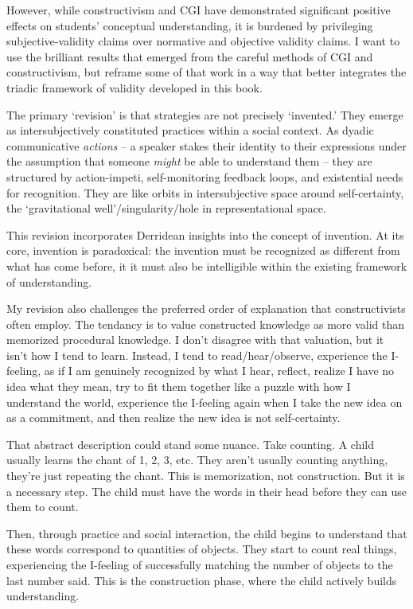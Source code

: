 \documentclass[12pt]{book}
\begin{document}
However, while constructivism and CGI have demonstrated significant positive effects on students' conceptual understanding, it is burdened by privileging subjective-validity claims over normative and objective validity claims. I want to use the brilliant results that emerged from the careful methods of CGI and constructivism, but reframe some of that work in a way that better integrates the triadic framework of validity developed in this book.

The primary `revision' is that strategies are not precisely `invented.' They emerge as intersubjectively constituted practices within a social context. As dyadic communicative \textit{actions} -- a speaker stakes their identity to their expressions under the assumption that someone \textit{might} be able to understand them -- they are structured by action-impeti, self-monitoring feedback loops, and existential needs for recognition. They are like orbits in intersubjective space around self-certainty, the `gravitational well'/singularity/hole in representational space. 

This revision incorporates Derridean insights into the concept of invention. At its core, invention is paradoxical: the invention must be recognized as different from what has come before, it it must also be intelligible within the existing framework of understanding.

My revision also challenges the preferred order of explanation that constructivists often employ. The tendancy is to value constructed knowledge as more valid than memorized procedural knowledge. I don't disagree with that valuation, but it isn't how I tend to learn. Instead, I tend to read/hear/observe, experience the I-feeling, as if I am genuinely recognized by what I hear, reflect, realize I have no idea what they mean, try to fit them together like a puzzle with how I understand the world, experience the I-feeling again when I take the new idea on as a commitment, and then realize the new idea is not self-certainty. 

That abstract description could stand some nuance. Take counting. A child usually learns the chant of 1, 2, 3, etc. They aren't usually counting anything, they're just repeating the chant. This is memorization, not construction. But it is a necessary step. The child must have the words in their head before they can use them to count. 

Then, through practice and social interaction, the child begins to understand that these words correspond to quantities of objects. They start to count real things, experiencing the I-feeling of successfully matching the number of objects to the last number said. This is the construction phase, where the child actively builds understanding. 
\end{document}
